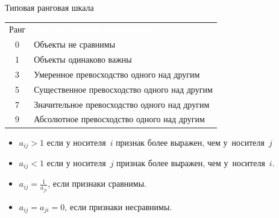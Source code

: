 \documentclass[unicode,11pt,notheorems,xcolor=table]{beamer}
\begin{document}
\begin{frame}{Типовая ранговая шкала}
    \begin{tabular}{cp{9.2cm}}
        \rowcolor{vgublue} \color{white}Ранг & \textcolor{white}{Описание степени превосходства}\tabularnewline
        0 & Объекты не сравнимы \\
        1 & Объекты одинаково важны \\
        3 & Умеренное превосходство одного над другим \\
        5 & Существенное превосходство одного над другим \\
        7 & Значительное превосходство одного над другим \\
        9 & Абсолютное превосходство одного над другим \\
    \end{tabular}

    \bigskip
    \structure{\hrule}
    \bigskip
    \begin{itemize}
        \item $a_{ij}>1$ если у носителя~$i$  признак более выражен, чем у~носителя~$j$
        \item $a_{ij}<1$ если у носителя~$j$  признак более выражен, чем у~носителя~$i$.
        \item $a_{ij}= \frac{1}{a_{ji}}$, если признаки сравнимы.
        \item $a_{ij}= a_{ji}=0$, если признаки несравнимы.
    \end{itemize}

\end{frame}
\end{document}
